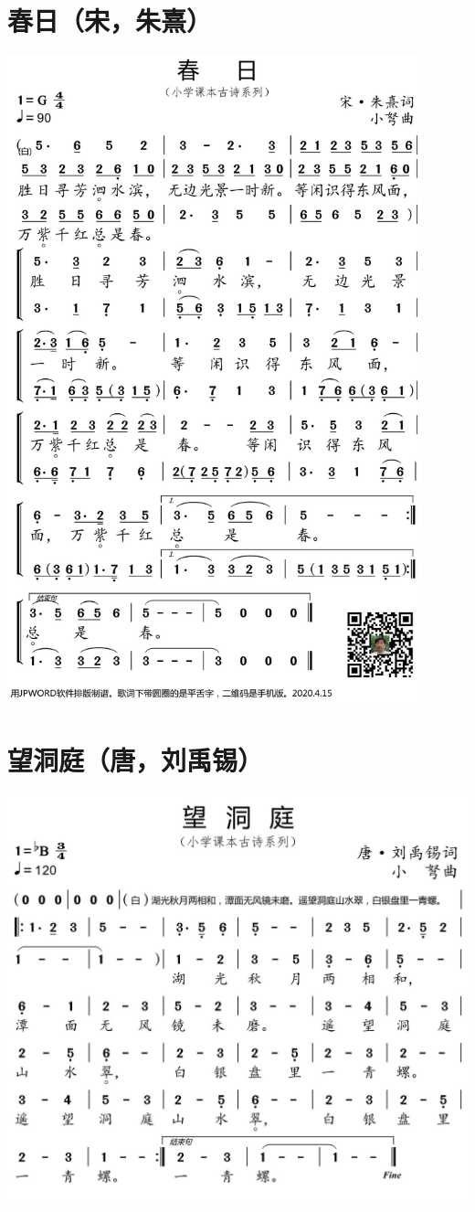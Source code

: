 \documentclass[cn,pad,chinesefont=nofont]{elegantbook}
\begin{document}
\section{春日（宋，朱熹）}
    \includegraphics[width=0.9\textwidth]{dongxiao/20200627-古诗-春日.jpg}   
\section{望洞庭（唐，刘禹锡）}
    \includegraphics[width=\textwidth]{dongxiao/20200627-古诗-望洞庭.jpg}   
\end{document}
